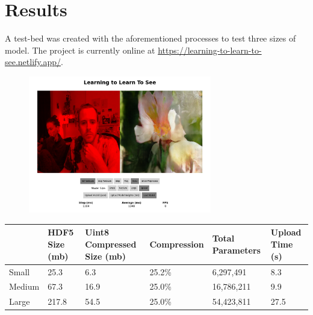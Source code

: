 \documentclass{article}
\begin{document}
\section{Results}
A test-bed was created with the aforementioned processes to test three sizes of model. The project is currently online at \url{https://learning-to-learn-to-see.netlify.app/}. %

\begin{figure}
	\includegraphics[width=8cm]{ltlts_online}
	\centering
\end{figure}


\begin{small}
	\begin{center}
		\begin{tabular}{p{1.5cm} p{1.5cm} p{1.5cm} p{1.5cm} p{1.5cm} p{1.5cm}}
			\toprule
			       & HDF5 Size (mb) & Uint8 Compressed Size (mb) & Compression & Total Parameters & Upload Time (s) \\
			\midrule
			Small  & 25.3           & 6.3                        & 25.2\%      & 6,297,491        & 8.3             \\
			Medium & 67.3           & 16.9                       & 25.0\%      & 16,786,211       & 9.9             \\
			Large  & 217.8          & 54.5                       & 25.0\%      & 54,423,811       & 27.5            \\
			\bottomrule
		\end{tabular}
	\end{center}
\end{small}

\end{document}
